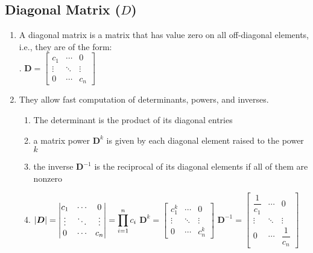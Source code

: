 \subsection{Diagonal Matrix ($D$)}


\begin{enumerate}
    \item A diagonal matrix is a matrix that has value zero on all off-diagonal elements, i.e., they are of the form:
    \hfill \cite{mfml/book/mml/Deisenroth-Faisal-Ong}
    \\
    .\hfill
    $
        \bm{D} = \begin{bmatrix}
        c_1 & \cdots & 0 \\
        \vdots & \ddots & \vdots \\
        0 & \cdots & c_n
        \end{bmatrix}
    $
    \hfill \cite{mfml/book/mml/Deisenroth-Faisal-Ong}

    \item They allow fast computation of determinants, powers, and inverses.
    \begin{enumerate}
        \item The determinant is the product of its diagonal entries
        \hfill \cite{mfml/book/mml/Deisenroth-Faisal-Ong}

        \item a matrix power $\bm{D}^k$ is given by each diagonal element raised to the power $k$
        \hfill \cite{mfml/book/mml/Deisenroth-Faisal-Ong}

        \item the inverse $\bm{D}^{-1}$ is the reciprocal of its diagonal elements if all of them are nonzero
        \hfill \cite{mfml/book/mml/Deisenroth-Faisal-Ong}

        \item[]
        $
            \left| \bm{D} \right|
            = \begin{vmatrix}
                c_1 & \cdots & 0 \\
                \vdots & \ddots & \vdots \\
                0 & \cdots & c_n
            \end{vmatrix}
            = \displaystyle\prod_{i=1}^n c_i
        $
        \hfill
        $
            \bm{D}^k
            = \begin{bmatrix}
                c_1^k & \cdots & 0 \\
                \vdots & \ddots & \vdots \\
                0 & \cdots & c_n^k
            \end{bmatrix}
        $
        \hfill
        $
            \bm{D}^{-1}
            = \begin{bmatrix}
                \dfrac{1}{c_1} & \cdots & 0 \\
                \vdots & \ddots & \vdots \\
                0 & \cdots & \dfrac{1}{c_n}
            \end{bmatrix}
        $
    \end{enumerate}


\end{enumerate}
